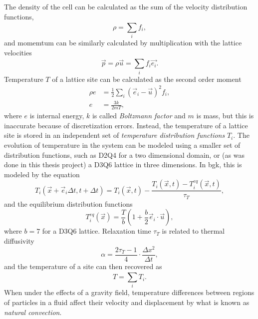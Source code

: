 The density of the cell can be calculated as the sum of the velocity distribution functions,
\begin{equation}
\rho = \sum\limits_{i}^{} f_i,
\end{equation}
and momemtum can be similarly calculated by multiplication with the lattice velocities  
\begin{equation}
\vec{p} = \rho\vec{u} = \sum\limits_{i}^{} f_i \vec{e_i}.
\end{equation}
Temperature $T$ of a lattice site can be calculated as the second order moment~\cites[pg.40]{Delbosc}
\begin{align}
\rho e &= \frac{1}{2} \sum\limits_{i}^{} (\vec{e}_i-\vec{u})^2 f_i,\\
e &= \frac{3k}{2mT},
\end{align}
where $e$ is internal energy, $k$ is called \textit{Boltzmann factor} and $m$ is mass, but this is inaccurate because of discretization errors. Instead, the temperature of a lattice site is stored in an independent set of \textit{temperature distribution functions} $T_i$. The evolution of temperature in the system can be modeled using a smaller set of distribution functions, such as D2Q4 for a two dimensional domain, or (as was done in this thesis project) a D3Q6 lattice in three dimensions. In \gls{bgk}, this is modeled by the equation
\begin{equation}
T_i(\vec{x}+\vec{e}_i \Delta t, t+\Delta t) = T_i(\vec{x},t) - \frac{T_i(\vec{x},t)-T_i^{eq}(\vec{x},t)}{\tau_T},
\end{equation}
and the equilibrium distribution functions
\begin{equation}
T_i^{eq}(\vec{x}) = \frac{T}{b} \left( 1+\frac{b}{2}\vec{e}_i \cdot \vec{u} \right),
\end{equation}
where $b=7$ for a D3Q6 lattice. Relaxation time $\tau_T$ is related to thermal diffusivity
\begin{equation}
\alpha = \frac{2\tau_T - 1}{4}\cdot\frac{\Delta x^2}{\Delta t},
\end{equation}
and the temperature of a site can then recovered as~\cites[pg.41]{Delbosc}
\begin{equation}
T = \sum\limits_{i}^{} T_i.
\end{equation}
When under the effects of a gravity field, temperature differences between regions of particles in a fluid affect their velocity and displacement by what is known as \textit{natural convection}.

